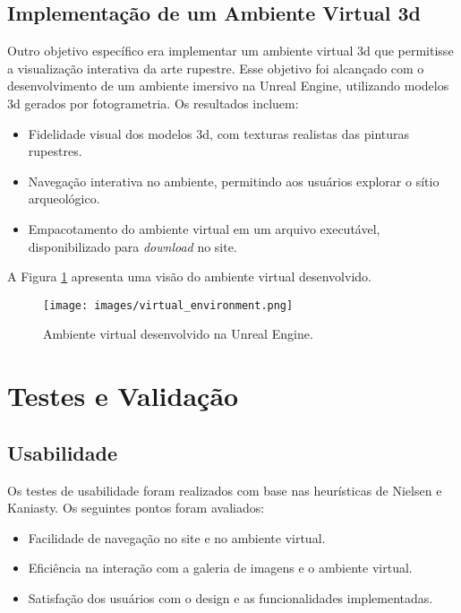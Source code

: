 \subsection{Implementação de um Ambiente Virtual \gls{3d}}
Outro objetivo específico era implementar um ambiente virtual \gls{3d} que permitisse a visualização interativa da arte rupestre. Esse objetivo foi alcançado com o desenvolvimento de um ambiente imersivo na Unreal Engine, utilizando modelos \gls{3d} gerados por fotogrametria. Os resultados incluem:
\begin{itemize}
    \item Fidelidade visual dos modelos \gls{3d}, com texturas realistas das pinturas rupestres.
    \item Navegação interativa no ambiente, permitindo aos usuários explorar o sítio arqueológico.
    \item Empacotamento do ambiente virtual em um arquivo executável, disponibilizado para \textit{download} no site.
\end{itemize}

A Figura \ref{fig:virtual_environment} apresenta uma visão do ambiente virtual desenvolvido.

\begin{figure}[H]
    \centering
    \texttt{[image: images/virtual\_environment.png]}
    \caption{Ambiente virtual desenvolvido na Unreal Engine.}
    \label{fig:virtual_environment}
\end{figure}


\section{Testes e Validação}

\subsection{Usabilidade}
Os testes de usabilidade foram realizados com base nas heurísticas de Nielsen e Kaniasty. Os seguintes pontos foram avaliados:
\begin{itemize}
    \item Facilidade de navegação no site e no ambiente virtual.
    \item Eficiência na interação com a galeria de imagens e o ambiente virtual.
    \item Satisfação dos usuários com o design e as funcionalidades implementadas.
\end{itemize}


